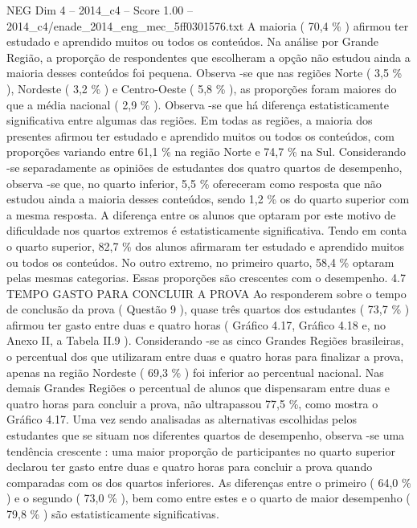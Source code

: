 \begin{textsample}{NEG Dim 4 – 2014\_c4 – Score 1.00 – 2014\_c4/enade\_2014\_eng\_mec\_5ff0301576.txt}
A maioria ( 70,4 \% ) afirmou ter estudado e aprendido muitos ou todos os conteúdos.
Na análise por Grande Região, a proporção de respondentes que escolheram a opção não estudou ainda a maioria desses conteúdos foi pequena.
Observa -se que nas regiões Norte ( 3,5 \% ), Nordeste ( 3,2 \% ) e Centro-Oeste ( 5,8 \% ), as proporções foram maiores do que a média nacional ( 2,9 \% ).
Observa -se que há diferença estatisticamente significativa entre algumas das regiões.
Em todas as regiões, a maioria dos presentes afirmou ter estudado e aprendido muitos ou todos os conteúdos, com proporções variando entre 61,1 \% na região Norte e 74,7 \% na Sul.
Considerando -se separadamente as opiniões de estudantes dos quatro quartos de desempenho, observa -se que, no quarto inferior, 5,5 \% ofereceram como resposta que não estudou ainda a maioria desses conteúdos, sendo 1,2 \% os do quarto superior com a mesma resposta.
A diferença entre os alunos que optaram por este motivo de dificuldade nos quartos extremos é estatisticamente significativa.
Tendo em conta o quarto superior, 82,7 \% dos alunos afirmaram ter estudado e aprendido muitos ou todos os conteúdos.
No outro extremo, no primeiro quarto, 58,4 \% optaram pelas mesmas categorias.
Essas proporções são crescentes com o desempenho. 4.7 TEMPO GASTO PARA CONCLUIR A PROVA Ao responderem sobre o tempo de conclusão da prova ( Questão 9 ), quase três quartos dos estudantes ( 73,7 \% ) afirmou ter gasto entre duas e quatro horas ( Gráfico 4.17, Gráfico 4.18 e, no Anexo II, a Tabela II.9 ).
Considerando -se as cinco Grandes Regiões brasileiras, o percentual dos que utilizaram entre duas e quatro horas para finalizar a prova, apenas na região Nordeste ( 69,3 \% ) foi inferior ao percentual nacional.
Nas demais Grandes Regiões o percentual de alunos que dispensaram entre duas e quatro horas para concluir a prova, não ultrapassou 77,5 \%, como mostra o Gráfico 4.17.
Uma vez sendo analisadas as alternativas escolhidas pelos estudantes que se situam nos diferentes quartos de desempenho, observa -se uma tendência crescente : uma maior proporção de participantes no quarto superior declarou ter gasto entre duas e quatro horas para concluir a prova quando comparadas com os dos quartos inferiores.
As diferenças entre o primeiro ( 64,0 \% ) e o segundo ( 73,0 \% ), bem como entre estes e o quarto de maior desempenho ( 79,8 \% ) são estatisticamente significativas.

\end{textsample}
